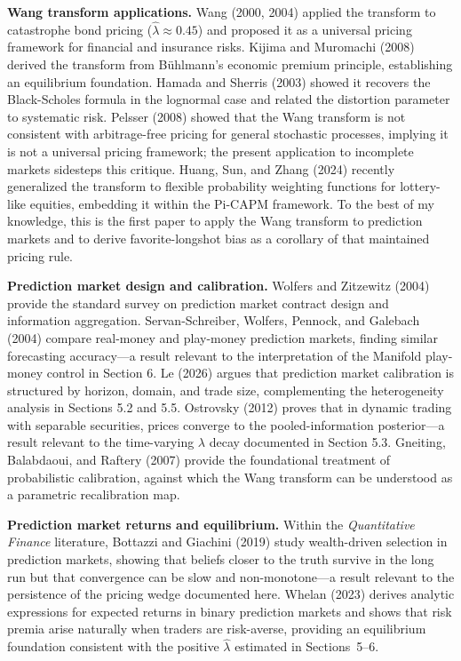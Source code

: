 \documentclass[12pt,a4paper]{article}
\begin{document}
\textbf{Wang transform applications.} Wang (2000, 2004) applied the
transform to catastrophe bond pricing (\(\hat{\lambda} \approx 0.45\))
and proposed it as a universal pricing framework for financial and
insurance risks. Kijima and Muromachi (2008) derived the transform from
Bühlmann's economic premium principle, establishing an equilibrium
foundation. Hamada and Sherris (2003) showed it recovers the
Black-Scholes formula in the lognormal case and related the distortion
parameter to systematic risk. Pelsser (2008) showed that the Wang
transform is not consistent with arbitrage-free pricing for general
stochastic processes, implying it is not a universal pricing framework;
the present application to incomplete markets sidesteps this critique.
Huang, Sun, and Zhang (2024) recently generalized the transform to
flexible probability weighting functions for lottery-like equities,
embedding it within the Pi-CAPM framework. To the best of my knowledge, this is the first paper to apply the Wang transform to prediction markets and to derive favorite-longshot bias as a corollary of that maintained pricing rule.

\textbf{Prediction market design and calibration.} Wolfers and Zitzewitz
(2004) provide the standard survey on prediction market contract design
and information aggregation. Servan-Schreiber, Wolfers, Pennock, and
Galebach (2004) compare real-money and play-money prediction markets,
finding similar forecasting accuracy---a result relevant to the
interpretation of the Manifold play-money control in Section 6. Le
(2026) argues that prediction market calibration is structured by
horizon, domain, and trade size, complementing the heterogeneity
analysis in Sections 5.2 and 5.5. Ostrovsky (2012) proves that in
dynamic trading with separable securities, prices converge to the
pooled-information posterior---a result relevant to the time-varying
\(\lambda\) decay documented in Section 5.3. Gneiting, Balabdaoui, and
Raftery (2007) provide the foundational treatment of probabilistic
calibration, against which the Wang transform can be understood as a
parametric recalibration map.

\textbf{Prediction market returns and equilibrium.} Within the \textit{Quantitative Finance} literature, Bottazzi and Giachini (2019) study wealth-driven selection in prediction markets, showing that beliefs closer to the truth survive in the long run but that convergence can be slow and non-monotone---a result relevant to the persistence of the pricing wedge documented here. Whelan (2023) derives analytic expressions for expected returns in binary prediction markets and shows that risk premia arise naturally when traders are risk-averse, providing an equilibrium foundation consistent with the positive $\hat{\lambda}$ estimated in Sections~5--6.
\end{document}
